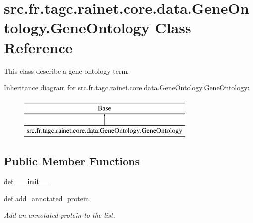 \hypertarget{classsrc_1_1fr_1_1tagc_1_1rainet_1_1core_1_1data_1_1GeneOntology_1_1GeneOntology}{\section{src.\-fr.\-tagc.\-rainet.\-core.\-data.\-Gene\-Ontology.\-Gene\-Ontology Class Reference}
\label{classsrc_1_1fr_1_1tagc_1_1rainet_1_1core_1_1data_1_1GeneOntology_1_1GeneOntology}
}


This class describe a gene ontology term.  


Inheritance diagram for src.\-fr.\-tagc.\-rainet.\-core.\-data.\-Gene\-Ontology.\-Gene\-Ontology\-:\begin{figure}[H]
\begin{center}
\leavevmode
\includegraphics[height=2.000000cm]{classsrc_1_1fr_1_1tagc_1_1rainet_1_1core_1_1data_1_1GeneOntology_1_1GeneOntology}
\end{center}
\end{figure}
\subsection*{Public Member Functions}
\begin{DoxyCompactItemize}
\item 
\hypertarget{classsrc_1_1fr_1_1tagc_1_1rainet_1_1core_1_1data_1_1GeneOntology_1_1GeneOntology_a0e9ab0aaa2d8fbb037f968fee05a619d}{def {\bfseries \-\_\-\-\_\-init\-\_\-\-\_\-}}\label{classsrc_1_1fr_1_1tagc_1_1rainet_1_1core_1_1data_1_1GeneOntology_1_1GeneOntology_a0e9ab0aaa2d8fbb037f968fee05a619d}

\item 
\hypertarget{classsrc_1_1fr_1_1tagc_1_1rainet_1_1core_1_1data_1_1GeneOntology_1_1GeneOntology_ac1d929697335fd2bfe10b406e6952bfe}{def \hyperlink{classsrc_1_1fr_1_1tagc_1_1rainet_1_1core_1_1data_1_1GeneOntology_1_1GeneOntology_ac1d929697335fd2bfe10b406e6952bfe}{add\-\_\-annotated\-\_\-protein}}\label{classsrc_1_1fr_1_1tagc_1_1rainet_1_1core_1_1data_1_1GeneOntology_1_1GeneOntology_ac1d929697335fd2bfe10b406e6952bfe}

\begin{DoxyCompactList}\small\item\em Add an annotated protein to the list. \end{DoxyCompactList}\end{DoxyCompactItemize}
